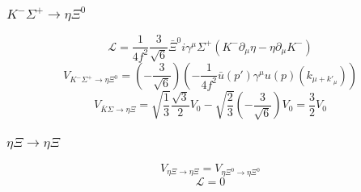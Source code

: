 \subsubsection{$K^{-}\Sigma^{+}\rightarrow\eta\Xi^{0}$}
\begin{equation}
	\mathcal{L}=\frac{1}{4f^2}\frac{3}{\sqrt{6}}\bar{\Xi}^{0}i\gamma^{\mu}\Sigma^{+}(K^{-}\partial_{\mu}\eta-\eta\partial_{\mu}K^{-})
\end{equation}
\begin{equation}
	V_{K^{-}\Sigma^{+}\rightarrow\eta\Xi^{0}}=\left(-\frac{3}{\sqrt{6}}\right)\left(-\frac{1}{4f^2}\bar{u}(p')\gamma^{\mu}u(p)(k_{\mu+k'_{\mu}})\right)
\end{equation}
\begin{equation}
	V_{\bar{K}\Sigma\rightarrow\eta\Xi}=\sqrt{\frac{1}{3}}\frac{\sqrt{3}}{2}V_{0}-\sqrt{\frac{2}{3}}(-\frac{3}{\sqrt{6}})V_{0}=\frac{3}{2}V_{0}
\end{equation}
\subsubsection{$\eta\Xi\rightarrow\eta\Xi$}
\begin{equation}
	V_{\eta\Xi\rightarrow\eta\Xi}=V_{\eta\Xi^{0}\rightarrow\eta\Xi^{0}}
\end{equation}
\begin{equation}
	\mathcal{L}=0
\end{equation}
